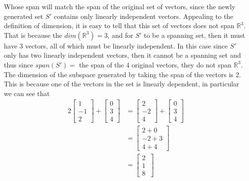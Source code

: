 \documentclass{report}
\begin{document}
Whose span will match the span of the original set of vectors, since the newly generated set $S'$ contains only linearly independent vectors. Appealing to the definition of dimension, it is easy to tell that this set of vectors does not span $\mathbb{R}^3$. That is because the $dim(\mathbb{R}^3)=3$, and for $S'$ to be a spanning set, then it must have 3 vectors, all of which must be linearly independent. In this case since $S'$ only has two linearly independent vectors, then it cannot be a spanning set and thus since $span(S') =$ the span of the 4 original vectors, they do not span $\mathbb{R}^3$.
\newpage
{}
\sol The dimension of the subspace generated by taking the span of the vectors is 2. This is because one of the vectors in the set is linearly dependent, in particular we can see that
$$
\begin{aligned}
	2 \begin{bmatrix} 1 \\ -1 \\ 2 \end{bmatrix} +
	\begin{bmatrix} 0 \\ 3 \\ 4 \end{bmatrix}  & =
	\begin{bmatrix} 2 \\ -2 \\ 4 \end{bmatrix} +
	\begin{bmatrix} 0 \\ 3 \\ 4 \end{bmatrix} \\
	& = \begin{bmatrix} 2 + 0 \\ -2 + 3 \\ 4 + 4 \end{bmatrix} \\
	& = \begin{bmatrix} 2 \\ 1 \\ 8 \ \end{bmatrix}
\end{aligned}
$$
\end{document}
